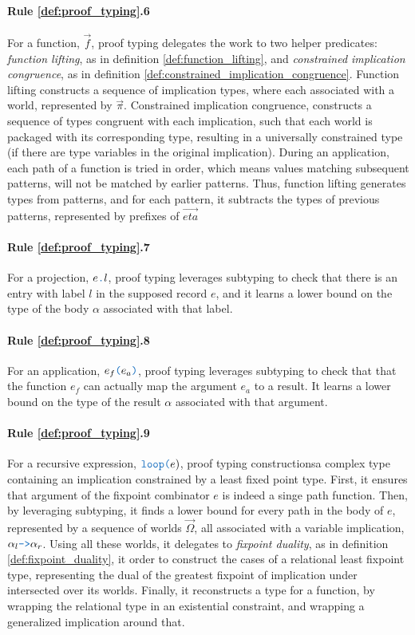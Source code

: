 \documentclass[acmsmall]{acmart}
\theoremstyle{definition}
\begin{document}
\paragraph{Rule \ref{def:proof_typing}.6}
For a function, $\vec{f}$, proof typing 
delegates the work to two helper predicates: \emph{function lifting}, as in definition \ref{def:function_lifting}, and
\emph{constrained implication congruence}, as in definition \ref{def:constrained_implication_congruence}.
Function lifting constructs a sequence of implication types, where each associated with a world, represented by $\vec{\pi}$.
Constrained implication congruence, constructs a sequence of types congruent with each implication,
such that each world is packaged with its corresponding type, resulting in a universally constrained type 
(if there are type variables in the original implication). 
During an application, each path of a function is tried in order, which means values matching subsequent
patterns, will not be matched by earlier patterns. Thus, function lifting generates types from patterns,
and for each pattern, it subtracts the types of previous patterns,
represented by prefixes of $\vec{eta}$

\paragraph{Rule \ref{def:proof_typing}.7}
For a projection, $e\obj{.}l$, proof typing
leverages subtyping to check that there is an entry with label $l$ 
in the supposed record $e$, and it learns a lower bound 
on the type of the body $\alpha$ associated with that label.


\paragraph{Rule \ref{def:proof_typing}.8}
For an application, $e_f\obj{(}e_a\obj{)}$, proof typing
leverages subtyping to check that that the function $e_f$ can actually
map the argument $e_a$ to a result. It learns a lower bound 
on the type of the result $\alpha$ associated with that argument.


\paragraph{Rule \ref{def:proof_typing}.9}
For a recursive expression, $\obj{loop(}e{)}$, proof typing
constructionsa complex type containing an implication constrained
by a least fixed point type.  
First, it ensures that argument of the fixpoint combinator $e$ is indeed a 
singe path function. Then, by leveraging subtyping, 
it finds a lower bound for every path in the body of $e$,
represented by a sequence of worlds $\vec{\Omega}$, 
all associated with a variable implication, $\alpha_l\obj{->}\alpha_r$.
Using all these worlds, it delegates to \emph{fixpoint duality}, as in definition \ref{def:fixpoint_duality},
it order to construct the cases of a relational least fixpoint type, 
representing the dual of the greatest fixpoint of implication under intersected over its worlds.
Finally, it reconstructs a type for a function, by wrapping the relational type in an existential constraint,
and wrapping a generalized implication around that. 
\end{document}
